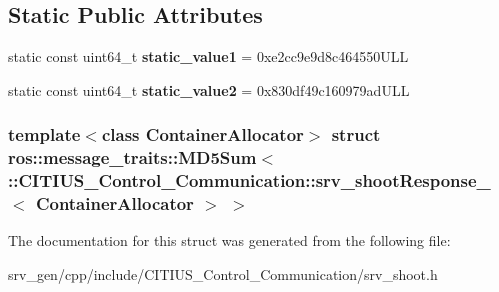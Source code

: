 \subsection*{\-Static \-Public \-Attributes}
\begin{DoxyCompactItemize}
\item 
\hypertarget{structros_1_1message__traits_1_1_m_d5_sum_3_01_1_1_c_i_t_i_u_s___control___communication_1_1srv_1914a976d2e8dbfc40b7a1c43c6d646f_a9606f54b4366e89725175bc6323e9ebe}{static const uint64\-\_\-t {\bfseries static\-\_\-value1} = 0xe2cc9e9d8c464550\-U\-L\-L}\label{structros_1_1message__traits_1_1_m_d5_sum_3_01_1_1_c_i_t_i_u_s___control___communication_1_1srv_1914a976d2e8dbfc40b7a1c43c6d646f_a9606f54b4366e89725175bc6323e9ebe}

\item 
\hypertarget{structros_1_1message__traits_1_1_m_d5_sum_3_01_1_1_c_i_t_i_u_s___control___communication_1_1srv_1914a976d2e8dbfc40b7a1c43c6d646f_a820c5673c78ce374a303ba952986fcd3}{static const uint64\-\_\-t {\bfseries static\-\_\-value2} = 0x830df49c160979ad\-U\-L\-L}\label{structros_1_1message__traits_1_1_m_d5_sum_3_01_1_1_c_i_t_i_u_s___control___communication_1_1srv_1914a976d2e8dbfc40b7a1c43c6d646f_a820c5673c78ce374a303ba952986fcd3}

\end{DoxyCompactItemize}
\subsubsection*{template$<$class Container\-Allocator$>$ struct ros\-::message\-\_\-traits\-::\-M\-D5\-Sum$<$ \-::\-C\-I\-T\-I\-U\-S\-\_\-\-Control\-\_\-\-Communication\-::srv\-\_\-shoot\-Response\-\_\-$<$ Container\-Allocator $>$ $>$}



\-The documentation for this struct was generated from the following file\-:\begin{DoxyCompactItemize}
\item 
srv\-\_\-gen/cpp/include/\-C\-I\-T\-I\-U\-S\-\_\-\-Control\-\_\-\-Communication/srv\-\_\-shoot.\-h\end{DoxyCompactItemize}
